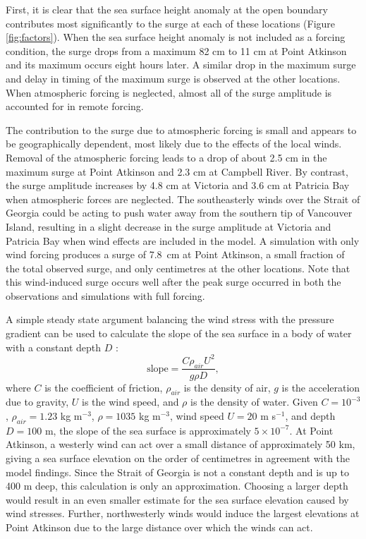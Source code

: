 \documentclass{tATO2e}
\begin{document}
First, it is clear that the sea surface height anomaly at the open boundary contributes most significantly to the surge at each of these locations (Figure \ref{fig:factors}). When the sea surface height anomaly is not included as a forcing condition, the surge drops from a maximum 82 cm to 11 cm at Point Atkinson and its maximum occurs eight hours later.  A similar drop in the maximum surge and delay in timing of the maximum surge is observed at the other locations.  When atmospheric forcing is neglected, almost all of the surge amplitude is accounted for in remote forcing.

The contribution to the surge due to atmospheric forcing is small and appears to be geographically dependent, most likely due to the effects of the local winds. Removal of the atmospheric forcing leads to a drop of about 2.5 cm in the maximum surge at Point Atkinson and 2.3 cm at Campbell River. By contrast, the surge amplitude increases by 4.8 cm at Victoria and 3.6 cm at Patricia Bay when atmospheric forces are neglected. The southeasterly winds over the Strait of Georgia could be acting to push water away from the southern tip of Vancouver Island, resulting in a slight decrease in the surge amplitude at Victoria and Patricia Bay when wind effects are included in the model. A simulation with only wind forcing produces a surge of 7.8~cm at Point Atkinson, a small fraction of the total observed surge, and only centimetres at the other locations.  Note that this wind-induced surge occurs well after the peak surge occurred in both the observations and simulations with full forcing.

A simple steady state argument balancing the wind stress with the pressure gradient can be used to calculate the slope of the sea surface in a body of water with a constant depth $D$ \citep{pugh2004changing}: 
\begin{equation}
\text{slope} = \frac{C\rho_{air}U^2}{g\rho D},
\end{equation}
where $C$ is the coefficient of friction, $\rho_{air}$ is the density of air, $g$ is the acceleration due to gravity, $U$ is the wind speed, and $\rho$ is the density of water. Given  $C=10^{-3}$, $\rho_{air}=1.23$ kg m$^{-3}$, $\rho= 1035$  kg m$^{-3}$, wind speed $U=20$ m s$^{-1}$, and depth $D=100$ m, the slope of the sea surface is approximately $5\times10^{-7}$. At Point Atkinson, a westerly wind can act over a small distance of approximately 50 km, giving a sea surface elevation on the order of centimetres in agreement with the model findings. Since the Strait of Georgia is not a constant depth and is up to 400 m deep, this calculation is only an approximation. Choosing a larger depth would result in an even smaller estimate for the sea surface elevation caused by wind stresses. Further, northwesterly winds would induce the largest elevations at Point Atkinson due to the large distance over which the winds can act. 
\end{document}
